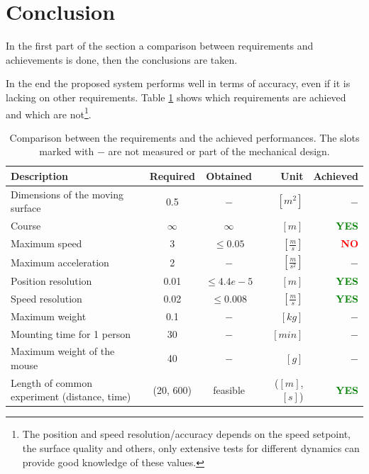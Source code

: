 \documentclass[12pt,a4paper, twoside]{article}
\begin{document}
\newpage
\section{Conclusion} \label{sec:conc}
In the first part of the section a comparison between requirements and achievements is done, then the conclusions are taken.
\newline

In the end the proposed system performs well in terms of accuracy, even if it is lacking on other requirements. Table \ref{tab:achieved} shows which requirements are achieved and which are not\footnote{The position and speed resolution/accuracy depends on the speed setpoint, the surface quality and others, only extensive tests for different dynamics can provide good knowledge of these values.}.
\begin{table}[H]
	\centering
	\begin{tabular}{l||c|c|r|r} 
		\textbf{Description}&\textbf{Required} &\textbf{Obtained} &\textbf{Unit} & \textbf{Achieved} \\ 
		\hline
		\hline 
		Dimensions of the moving surface & 0.5 &$-$&$[m^2]$&$-$ \\ 
		\hline 
		Course & $\infty$ &$\infty$ & $[m]$&\textcolor{green}{\textbf{YES}}  \\ 
		\hline 
		Maximum speed & 3 & $\leq0.05$ &$[\frac{m}{s}]$&\textcolor{red}{\textbf{NO}} \\ 
		\hline 
		Maximum acceleration & 2 &$-$ &$[\frac{m}{s^2}]$&$-$  \\ 
		\hline 
		Position resolution & 0.01 & $\leq 4.4e-5$ & $[m]$ &\textcolor{green}{\textbf{YES}}  \\ 
		\hline 
		Speed resolution & 0.02 & $\leq 0.008$ & $[\frac{m}{s}]$ &\textcolor{green}{\textbf{YES}} \\ 
		\hline 
		Maximum weight & 0.1 & $-$ & $[kg]$ & $-$  \\  
		\hline 
		Mounting time for 1 person & 30 & $-$ & $[min]$ & $-$ \\
		\hline 
		Maximum weight of the mouse & 40 & $-$  & $[g]$ & $-$\\
		\hline 
		Length of common experiment (distance, time) & (20, 600) & feasible & ($[m]$,$[s]$) &\textcolor{green}{\textbf{YES}} \\
	\end{tabular} 
	\caption[Achieved performances]{Comparison between the requirements and the achieved performances. The slots marked with $-$ are not measured or part of the mechanical design.}
	\label{tab:achieved}
\end{table}
\end{document}
